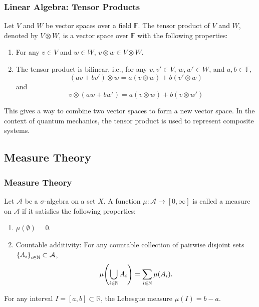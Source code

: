 \documentclass[11pt, xcolor={dvipsnames, svgnames, table, x11names}, color]{beamer}
\newcommand{\R}{\mathbb{R}}
\newcommand{\F}{\mathbb{F}}
\begin{document}
\begin{frame}
    \frametitle{Linear Algebra: Tensor Products}
    \begin{definition}
        Let $V$ and $W$ be vector spaces over a field $\F$. The tensor product of $V$ and $W$, denoted by $V \otimes W$, is a vector space over $\F$ with the following properties:
        \begin{enumerate}
            \item For any $v \in V$ and $w \in W$, $v \otimes w \in V \otimes W$.
            \item The tensor product is bilinear, i.e., for any $v, v' \in V$, $w, w' \in W$, and $a, b \in \F$,
                  \begin{equation*}
                      (a v + b v') \otimes w = a(v \otimes w) + b(v' \otimes w)
                  \end{equation*}
                  and
                  \begin{equation*}
                      v \otimes (a w + b w') = a(v \otimes w) + b(v \otimes w')
                  \end{equation*}
        \end{enumerate}
    \end{definition}

    This gives a way to combine two vector spaces to form a new vector space. In the context of quantum mechanics, the tensor product is used to represent composite systems.
\end{frame}


\subsection{Measure Theory}
\begin{frame}
    \frametitle{Measure Theory}
    \begin{definition}
        Let $\mathcal{A}$ be a \alert{$\sigma$-algebra} on a set $X$. A function $\mu: \mathcal{A} \to [0, \infty]$ is called a measure on $\mathcal{A}$ if it satisfies the following properties:
        \begin{enumerate}
            \item $\mu(\emptyset) = 0$.
            \item Countable additivity: For any countable collection of pairwise disjoint sets $\qty{A_i}_{i \in \mathbb{N}} \subset \mathcal{A}$,
                  \begin{equation*}
                      \mu\qty(\bigcup_{i \in \mathbb{N}} A_i) = \sum_{i \in \mathbb{N}} \mu(A_i).
                  \end{equation*}
        \end{enumerate}
    \end{definition}

    \begin{example}
        For any interval $I = [a, b] \subset \R$, the Lebesgue measure $\mu(I) = b - a$.
    \end{example}
\end{frame}
\end{document}
